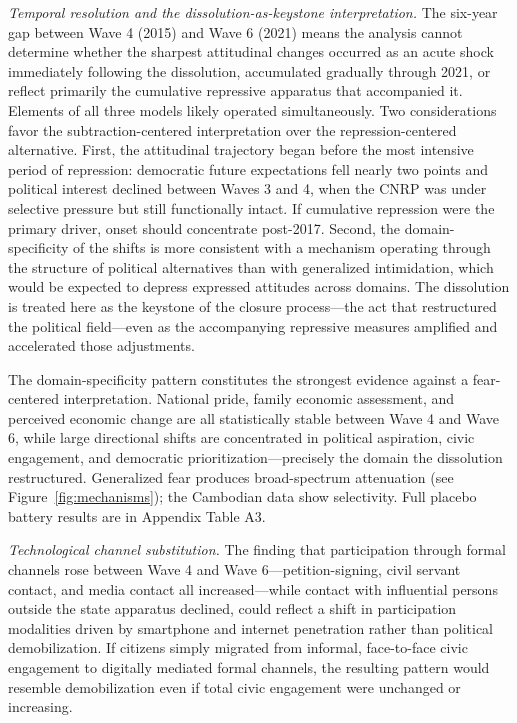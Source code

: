 \documentclass[Review,times,sageh,doublespace]{sagej}
\begin{document}
\emph{Temporal resolution and the dissolution-as-keystone
interpretation.} The six-year gap between Wave 4 (2015) and Wave 6
(2021) means the analysis cannot determine whether the sharpest
attitudinal changes occurred as an acute shock immediately following the
dissolution, accumulated gradually through 2021, or reflect primarily
the cumulative repressive apparatus that accompanied it. Elements of all
three models likely operated simultaneously. Two considerations favor
the subtraction-centered interpretation over the repression-centered
alternative. First, the attitudinal trajectory began before the most
intensive period of repression: democratic future expectations fell
nearly two points and political interest declined between Waves 3 and 4,
when the CNRP was under selective pressure but still functionally
intact. If cumulative repression were the primary driver, onset should
concentrate post-2017. Second, the domain-specificity of the shifts is
more consistent with a mechanism operating through the structure of
political alternatives than with generalized intimidation, which would
be expected to depress expressed attitudes across domains. The
dissolution is treated here as the keystone of the closure process---the
act that restructured the political field---even as the accompanying
repressive measures amplified and accelerated those adjustments.

The domain-specificity pattern constitutes the strongest evidence
against a fear-centered interpretation. National pride, family economic
assessment, and perceived economic change are all statistically stable
between Wave 4 and Wave 6, while large directional shifts are
concentrated in political aspiration, civic engagement, and democratic
prioritization---precisely the domain the dissolution restructured.
Generalized fear produces broad-spectrum attenuation (see
Figure~\ref{fig:mechanisms}); the Cambodian data show selectivity. Full
placebo battery results are in Appendix Table A3.

\emph{Technological channel substitution.} The finding that
participation through formal channels rose between Wave 4 and Wave
6---petition-signing, civil servant contact, and media contact all
increased---while contact with influential persons outside the state
apparatus declined, could reflect a shift in participation modalities
driven by smartphone and internet penetration rather than political
demobilization. If citizens simply migrated from informal, face-to-face
civic engagement to digitally mediated formal channels, the resulting
pattern would resemble demobilization even if total civic engagement
were unchanged or increasing.
\end{document}
